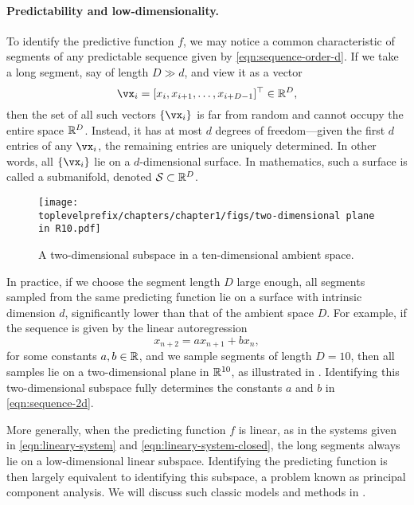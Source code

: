 \documentclass[../../book-main.tex]{subfiles}
\begin{document}
\paragraph{Predictability and low-dimensionality.}
To identify the predictive function $f$, we may notice a common characteristic of segments of any predictable sequence given by \eqref{eqn:sequence-order-d}. If we take a long segment, say of length $D \gg d$, and view it as a vector
\begin{equation}
    \vx_i = [x_i, x_{i+1}, \ldots, x_{i+D-1}]^\top \in \mathbb{R}^D,
\end{equation}
then the set of all such vectors $\{\vx_i\}$ is far from random and cannot occupy the entire space $\mathbb{R}^D$. Instead, it has at most $d$ degrees of freedom---given the first $d$ entries of any $\vx_i$, the remaining entries are uniquely determined. In other words, all $\{\vx_i\}$ lie on a $d$-dimensional surface. In mathematics, such a surface is called a submanifold, denoted $\mathcal{S} \subset \mathbb{R}^D$.

\begin{figure}[t]
\centering
\texttt{[image: \\toplevelprefix/chapters/chapter1/figs/two-dimensional plane in R10.pdf]}
    \caption{A two-dimensional subspace in a ten-dimensional ambient space.}
    \label{fig:lowdimplane}
\end{figure}
In practice, if we choose the segment length $D$ large enough, all segments sampled from the same predicting function lie on a surface with intrinsic dimension $d$, significantly lower than that of the ambient space $D$. For example, if the sequence is given by the linear autoregression
\begin{equation}
    x_{n+2} = a x_{n+1} + b x_n,
    \label{eqn:sequence-2d}
\end{equation}
for some constants $a, b \in \mathbb{R}$, and we sample segments of length $D = 10$, then all samples lie on a two-dimensional plane in $\mathbb{R}^{10}$, as illustrated in . Identifying this two-dimensional subspace fully determines the constants $a$ and $b$ in \eqref{eqn:sequence-2d}.

More generally, when the predicting function $f$ is linear, as in the systems given in \eqref{eqn:lineary-system} and \eqref{eqn:lineary-system-closed}, the long segments always lie on a low-dimensional linear subspace. Identifying the predicting function is then largely equivalent to identifying this subspace, a problem known as principal component analysis. We will discuss such classic models and methods in .
\end{document}

